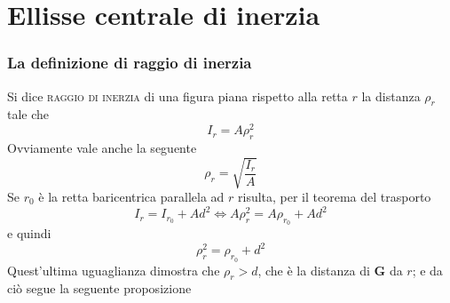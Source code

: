 \clearpage
\pagestyle{fancy}
\part{Ellisse centrale di inerzia}
\setcounter{section}{0}
\section{La definizione di raggio di inerzia}
Si dice \textsc{raggio di inerzia} di una figura piana rispetto alla retta $r$ la distanza $\rho_r$ tale che 
\begin{equation} \label{equazione6-1}
\boxed{I_r = A\rho_{r}^{2}}
\tag{6.1}
\end{equation}
Ovviamente vale anche la seguente
\begin{equation} \label{equazione6-1}
\boxed{\rho_r = \sqrt{\frac{I_r}{A}}}
\tag{6.2}
\end{equation}
Se $r_0$ è la retta baricentrica parallela ad $r$ risulta, per il teorema del trasporto
\begin{equation*}
I_r = I_{r_{0}} + Ad^2 \iff A\rho_{r}^{2} = A\rho_{r_{0}} + Ad^2
\end{equation*}
e quindi
\begin{equation*}
\rho_{r}^{2} = \rho_{r_{0}} + d^2
\end{equation*}
Quest'ultima uguaglianza dimostra che $\rho_{r}>d$, che è la distanza di $\mathbf{G}$ da $r$; e da ciò segue la seguente proposizione
\\

